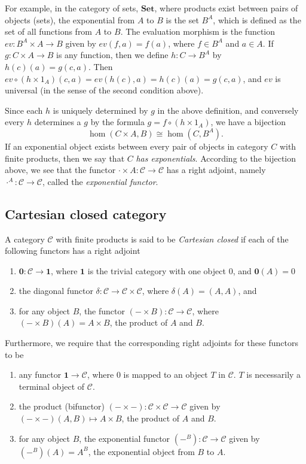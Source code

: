 \documentclass[10pt]{article}
\theoremstyle{plain}
\theoremstyle{definition}
\theoremstyle{remark}
\begin{document}
For example, in the category of sets, $\textbf{Set}$, where products exist between pairs of objects (sets), the exponential from $A$ to $B$ is the set $B^A$, which is defined as the set of all functions from $A$ to $B$.  The evaluation morphism is the function $ev: B^A\times A\to B$ given by $ev(f,a)=f(a)$, where $f\in B^A$ and $a\in A$.  If $g:C\times A\to B$ is any function, then we define $h:C\to B^A$ by $h(c)(a)=g(c,a)$.  Then $ev\circ (h\times 1_A)(c,a)=ev(h(c),a)=h(c)(a)=g(c,a)$, and $ev$ is universal (in the sense of the second condition above).

Since each $h$ is uniquely determined by $g$ in the above definition, and conversely every $h$ determines a $g$ by the formula $g=f\circ (h\times 1_A)$, we have a bijection
$$
\hom(C\times A,B)\cong \hom(C,B^A).
$$
If an exponential object exists between every pair of objects in category $C$ with finite products, then we say that $C$ \emph{has exponentials}.  According to the bijection above, we see that the functor $\cdot\times A:\mathcal{C}\to \mathcal{C}$ has a right adjoint, namely $\cdot ^A:\mathcal{C}\to\mathcal{C}$, called the \emph{exponential functor}.

\subsection{Cartesian closed category}
A category $\mathcal{C}$ with finite products is said to be \emph{Cartesian closed} if each of the following functors has a right adjoint
\begin{enumerate}
\item $\textbf{0}:\mathcal{C}\to \textbf{1}$, where $\textbf{1}$ is the trivial category with one object $0$, and $\textbf{0}(A)=0$
\item the diagonal functor $\delta: \mathcal{C}\to \mathcal{C}\times\mathcal{C}$, where $\delta(A)=(A,A)$, and
\item for any object $B$, the functor $(-\times B):\mathcal{C}\to\mathcal{C}$, where $(-\times B)(A)=A\times B$, the product of $A$ and $B$.
\end{enumerate}
Furthermore, we require that the corresponding right adjoints for these functors to be
\begin{enumerate}
\item any functor $\textbf{1}\to\mathcal{C}$, where $0$ is mapped to an object $T$ in $\mathcal{C}$.  $T$ is necessarily a terminal object of $\mathcal{C}$.
\item the product (bifunctor) $(-\times -): \mathcal{C} \times \mathcal{C}\to \mathcal{C}$ given by $(-\times -)(A,B)\mapsto A\times B$, the product of $A$ and $B$.
\item for any object $B$, the exponential functor $(-^B):\mathcal{C}\to\mathcal{C}$ given by $(-^B)(A)=A^B$, the exponential object from $B$ to $A$.
\end{enumerate}
\end{document}
